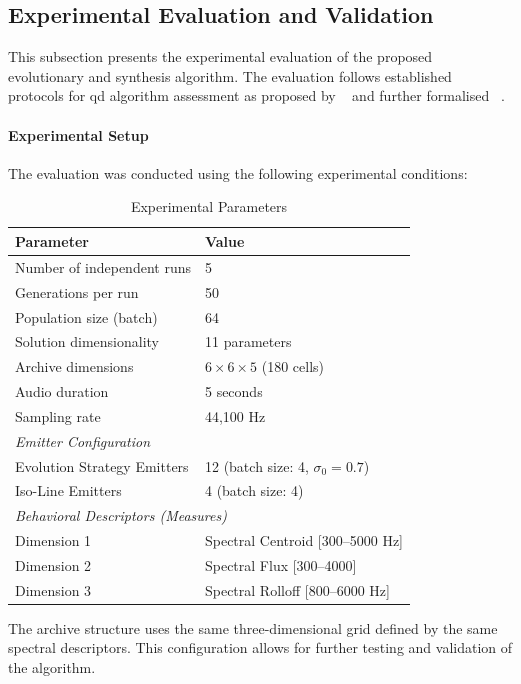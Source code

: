 \subsection{Experimental Evaluation and Validation}
\label{subsec:evaluation}

This subsection presents the experimental evaluation of the proposed evolutionary and synthesis algorithm. The evaluation follows established protocols for \gls{qd} algorithm assessment as proposed by ~\cite{mouret2015illuminating} and further formalised ~\cite{pugh2016quality}.

\paragraph{Experimental Setup}

The evaluation was conducted using the following experimental conditions:

\begin{table}[htbp]
\centering
\caption{Experimental Parameters}
\label{tab:exp_params}
\begin{tabular}{ll}
\toprule
\textbf{Parameter} & \textbf{Value} \\
\midrule
Number of independent runs & 5 \\
Generations per run & 50 \\
Population size (batch) & 64 \\
Solution dimensionality & 11 parameters \\
Archive dimensions & $6 \times 6 \times 5$ (180 cells) \\
Audio duration & 5 seconds \\
Sampling rate & 44,100 Hz \\
\midrule
\multicolumn{2}{l}{\textit{Emitter Configuration}} \\
Evolution Strategy Emitters & 12 (batch size: 4, $\sigma_0 = 0.7$) \\
Iso-Line Emitters & 4 (batch size: 4) \\
\midrule
\multicolumn{2}{l}{\textit{Behavioral Descriptors (Measures)}} \\
Dimension 1 & Spectral Centroid [300--5000 Hz] \\
Dimension 2 & Spectral Flux [300--4000] \\
Dimension 3 & Spectral Rolloff [800--6000 Hz] \\
\bottomrule
\end{tabular}
\end{table}

The archive structure uses the same three-dimensional grid defined by the same spectral descriptors. This configuration allows for further testing and validation of the algorithm.

